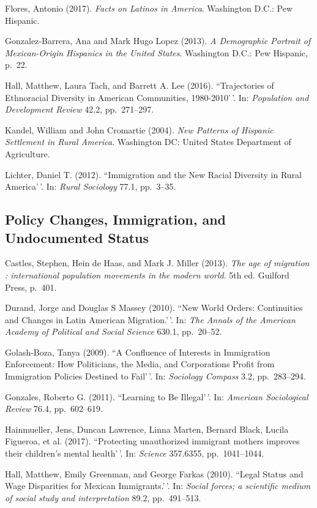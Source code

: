 \documentclass[11pt,]{article}
\begin{document}
Flores, Antonio (2017). \emph{Facts on Latinos in America}. Washington
D.C.: Pew Hispanic.

Gonzalez-Barrera, Ana and Mark Hugo Lopez (2013).
\emph{A Demographic Portrait of Mexican-Origin Hispanics in the United States}.
Washington D.C.: Pew Hispanic, p.~22.

Hall, Matthew, Laura Tach, and Barrett A. Lee (2016). ``Trajectories of
Ethnoracial Diversity in American Communities, 1980-2010'\,'. In:
\emph{Population and Development Review} 42.2, pp.~271--297.

Kandel, William and John Cromartie (2004).
\emph{New Patterns of Hispanic Settlement in Rural America}. Washington
DC: United States Department of Agriculture.

Lichter, Daniel T. (2012). ``Immigration and the New Racial Diversity in
Rural America'\,'. In: \emph{Rural Sociology} 77.1, pp.~3--35.

\hypertarget{policy-changes-immigration-and-undocumented-status}{%
\subsection{Policy Changes, Immigration, and Undocumented
Status}\label{policy-changes-immigration-and-undocumented-status}}

Castles, Stephen, Hein de Haas, and Mark J. Miller (2013).
\emph{The age of migration : international population movements in the modern world}.
5th ed. Guilford Press, p.~401.

Durand, Jorge and Douglas S Massey (2010). ``New World Orders:
Continuities and Changes in Latin American Migration.'\,'. In:
\emph{The Annals of the American Academy of Political and Social Science}
630.1, pp.~20--52.

Golash-Boza, Tanya (2009). ``A Confluence of Interests in Immigration
Enforcement: How Politicians, the Media, and Corporations Profit from
Immigration Policies Destined to Fail'\,'. In: \emph{Sociology Compass}
3.2, pp.~283--294.

Gonzales, Roberto G. (2011). ``Learning to Be Illegal'\,'. In:
\emph{American Sociological Review} 76.4, pp.~602--619.

Hainmueller, Jens, Duncan Lawrence, Linna Marten, Bernard Black, Lucila
Figueroa, et al. (2017). ``Protecting unauthorized immigrant mothers
improves their children's mental health'\,'. In: \emph{Science}
357.6355, pp.~1041--1044.

Hall, Matthew, Emily Greenman, and George Farkas (2010). ``Legal Status
and Wage Disparities for Mexican Immigrants.'\,'. In:
\emph{Social forces; a scientific medium of social study and interpretation}
89.2, pp.~491--513.
\end{document}
